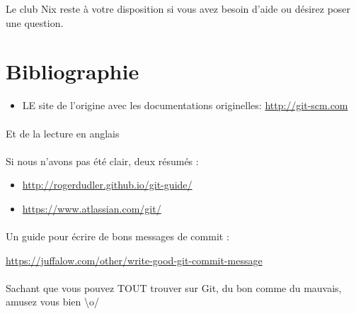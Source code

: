 \documentclass[french, a4paper, 12pt, titlepage]{article}
\begin{document}
Le club Nix reste à votre disposition si vous avez besoin d'aide ou désirez poser une question.

\section*{Bibliographie}

\begin{itemize}
	\item LE site de l'origine avec les documentations originelles: \url{http://git-scm.com}
\end{itemize}

\paragraph{}Et de la lecture en anglais
\paragraph{}
Si nous n'avons pas été clair, deux résumés :
\begin{itemize}
	\item \url{http://rogerdudler.github.io/git-guide/}
	\item \url{https://www.atlassian.com/git/}
\end{itemize}


\paragraph{}
Un guide pour écrire de bons messages de commit :

\url{https://juffalow.com/other/write-good-git-commit-message}



\paragraph{}Sachant que vous pouvez TOUT trouver sur Git, du bon comme du mauvais, amusez vous bien \textbackslash o/

\end{document}
